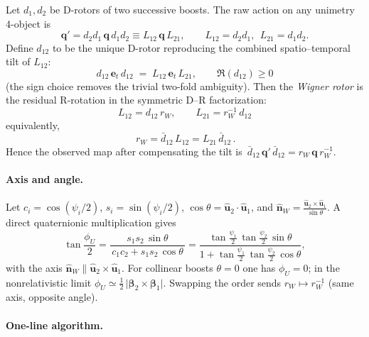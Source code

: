\documentclass[11pt]{article}
\numberwithin{equation}{section}
\providecommand{\uhat}{\hat{\mathbf u}}
\begin{document}
Let $d_1,d_2$ be D-rotors of two successive boosts. The raw action on any unimetry 4-object is
\begin{equation}
\mathbf q' = d_2 d_1\, \mathbf q\, d_1 d_2 \equiv L_{12}\,\mathbf q\,L_{21},\qquad
L_{12}=d_2 d_1,\ \ L_{21}=d_1 d_2.
\end{equation}
Define $d_{12}$ to be the unique D-rotor reproducing the combined spatio--temporal tilt of $L_{12}$:
\begin{equation}
\boxed{\, d_{12}\,\mathbf e_t\, d_{12} \;=\; L_{12}\,\mathbf e_t\, L_{21},\qquad \Re(d_{12})\ge0 \,}
\label{eq:d12-uniqueness}
\end{equation}
(the sign choice removes the trivial two-fold ambiguity). Then the \emph{Wigner rotor} is the residual
R-rotation in the symmetric D--R factorization:
\begin{equation}
\boxed{\, L_{12}=d_{12}\,r_W,\qquad L_{21}=r_W^{-1}\,d_{12} \,}
\label{eq:DR-polar}
\end{equation}
equivalently,
\begin{equation}
\boxed{\, r_W=\bar d_{12}\,L_{12}=L_{21}\,\bar d_{12} \,}.
\label{eq:wigner-rotor-def}
\end{equation}
Hence the observed map after compensating the tilt is $\,\bar d_{12}\,\mathbf q'\,\bar d_{12}=r_W\,\mathbf q\,r_W^{-1}$.

\paragraph{Axis and angle.}
Let $c_i=\cos(\psi_i/2)$, $s_i=\sin(\psi_i/2)$, $\cos\theta=\uhat_2\!\cdot\!\uhat_1$, and
$\hat{\mathbf n}_W=\frac{\uhat_2\times \uhat_1}{\sin\theta}$. A direct quaternionic multiplication
gives
\begin{equation}
\tan\frac{\phi_U}{2}=
\frac{s_1 s_2\,\sin\theta}{\,c_1 c_2+s_1 s_2\,\cos\theta\,}
=\frac{\tan\frac{\psi_1}{2}\,\tan\frac{\psi_2}{2}\,\sin\theta}{1+\tan\frac{\psi_1}{2}\,\tan\frac{\psi_2}{2}\,\cos\theta},
\end{equation}
with the axis $\hat{\mathbf n}_W\parallel \uhat_2\times\uhat_1$. For collinear boosts $\theta=0$ one has $\phi_U=0$;
in the nonrelativistic limit $\phi_U\simeq \tfrac12\,\lvert \boldsymbol\beta_2\times\boldsymbol\beta_1\rvert$. Swapping the order sends
$r_W\mapsto r_W^{-1}$ (same axis, opposite angle).

\paragraph{One-line algorithm.}
\begin{center}
\end{center}
\end{document}
